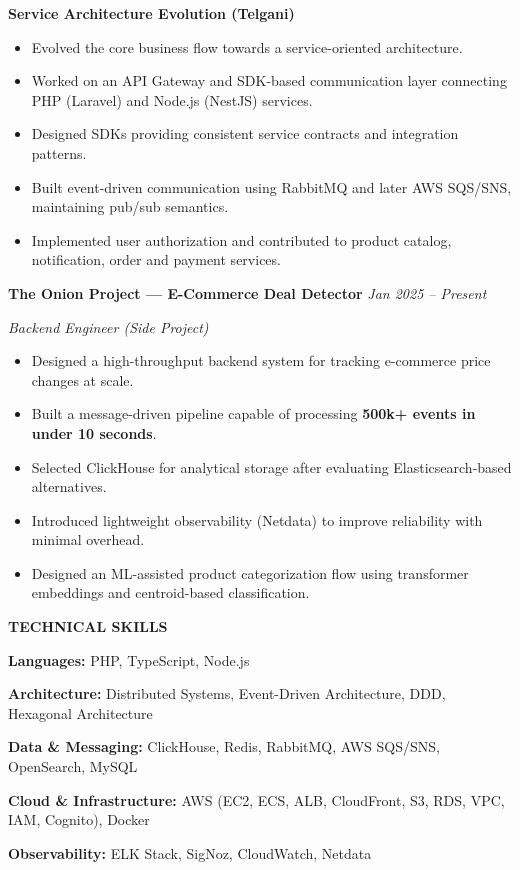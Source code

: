 \documentclass[9pt,a4paper]{article}
\newcommand{\cvsection}[1]{%
  \vspace{8pt}%
  {\bfseries #1}\par
  \vspace{4pt}%
}
\newcommand{\cvrole}[2]{%
  \textbf{#1} \hfill \textit{#2}\par
}
\newcommand{\cvsubtitle}[1]{%
  \textit{#1}\par
}
\begin{document}
\textbf{Service Architecture Evolution (Telgani)}\par
\begin{itemize}
  \item Evolved the core business flow towards a service-oriented architecture.
  \item Worked on an API Gateway and SDK-based communication layer connecting PHP (Laravel) and Node.js (NestJS) services.
  \item Designed SDKs providing consistent service contracts and integration patterns.
  \item Built event-driven communication using RabbitMQ and later AWS SQS/SNS, maintaining pub/sub semantics.
  \item Implemented user authorization and contributed to product catalog, notification, order and payment services.
\end{itemize}
\vspace*{4pt}

\cvrole{The Onion Project — E-Commerce Deal Detector}{Jan 2025 -- Present}
\cvsubtitle{Backend Engineer (Side Project)}
\begin{itemize}
  \item Designed a high-throughput backend system for tracking e-commerce price changes at scale.
  \item Built a message-driven pipeline capable of processing \textbf{500k+ events in under 10 seconds}.
  \item Selected ClickHouse for analytical storage after evaluating Elasticsearch-based alternatives.
  \item Introduced lightweight observability (Netdata) to improve reliability with minimal overhead.
  \item Designed an ML-assisted product categorization flow using transformer embeddings and centroid-based classification.
\end{itemize}

\cvsection{TECHNICAL SKILLS}
\textbf{Languages:} PHP, TypeScript, Node.js\par
\textbf{Architecture:} Distributed Systems, Event-Driven Architecture, DDD, Hexagonal Architecture\par
\textbf{Data \& Messaging:} ClickHouse, Redis, RabbitMQ, AWS SQS/SNS, OpenSearch, MySQL\par
\textbf{Cloud \& Infrastructure:} AWS (EC2, ECS, ALB, CloudFront, S3, RDS, VPC, IAM, Cognito), Docker\par
\textbf{Observability:} ELK Stack, SigNoz, CloudWatch, Netdata
\end{document}
